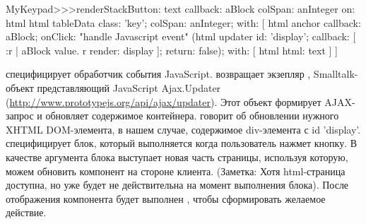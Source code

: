 \documentclass[a4paper,10pt,twoside]{book}
\begin{document}

\begin{code}{}
MyKeypad>>>renderStackButton: text callback: aBlock colSpan: anInteger on: html 
	html tableData
		class: 'key';
		colSpan: anInteger;
		with: [
			html anchor
				callback: aBlock;
				onClick:				"handle Javascript event"
					(html updater
						id: 'display';
						callback: [ :r |
							aBlock value.
							r render: display ];
						return: false);
				with: [ html html: text ] ]
\end{code}


 специфицирует обработчик события JavaScript.
 возвращает экзепляр , Smalltalk-объект
представляющий JavaScript Ajax.Updater
(\url{http://www.prototypejs.org/api/ajax/updater}). Этот объект формирует
AJAX-запрос и обновляет содержимое контейнера.
 говорит об обновлении нужного XHTML DOM-элемента, в нашем случае,
содержимое div-элемента с id 'display'.
 специфицирует блок, который выполняется когда пользователь
нажмет кнопку. В качестве аргумента блока выступает новая часть страницы,
используя которую, можем обновить компонент на стороне клиента.
(Заметка: Хотя html-страница доступна, но уже будет не действительна на
момент выполнения блока).
После отображения компонента будет выполнен ,
чтобы сформировать желаемое действие.
\end{document}
